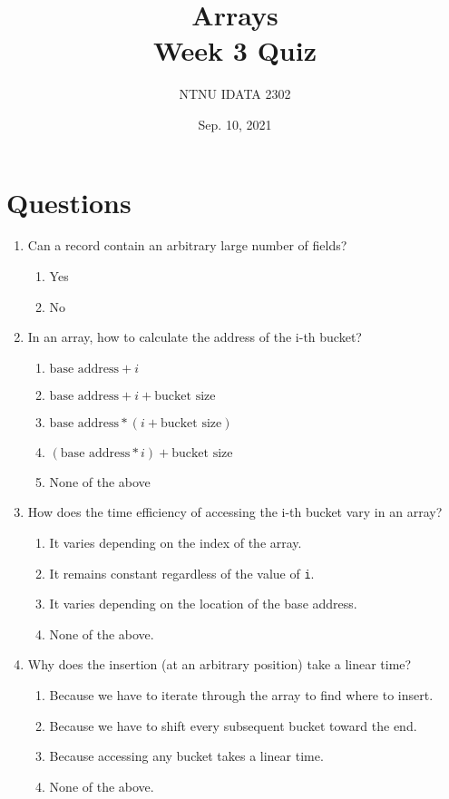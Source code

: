 \documentclass[11pt]{article}
\author{NTNU IDATA 2302}
\date{Sep. 10, 2021}
\title{Arrays\\\medskip
\large Week 3 Quiz}
\begin{document}
\maketitle


\section{Questions}
\label{sec:orgcf7c15f}

\begin{enumerate}
\item Can a record contain an arbitrary large number of fields?
\begin{enumerate}
\item Yes
\item No
\end{enumerate}

\item In an array, how to calculate the address of the i-th bucket?
\begin{enumerate}
\item \(\text{base address} + i\)
\item \(\text{base address} + i + \text{bucket size}\)
\item \(\text{base address} * (i + \text{bucket size})\)
\item \((\text{base address} * i) + \text{bucket size}\)
\item None of the above
\end{enumerate}

\item How does the time efficiency of accessing the i-th bucket vary in an
array?
\begin{enumerate}
\item It varies depending on the index of the array.
\item It remains constant regardless of the value of \texttt{i}.
\item It varies depending on the location of the base address.
\item None of the above.
\end{enumerate}

\item Why does the insertion (at an arbitrary position) take a linear
time?
\begin{enumerate}
\item Because we have to iterate through the array to find where to
insert.
\item Because we have to shift every subsequent bucket toward the
end.
\item Because accessing any bucket takes a linear time.
\item None of the above.
\end{enumerate}


\end{enumerate}
\end{document}
